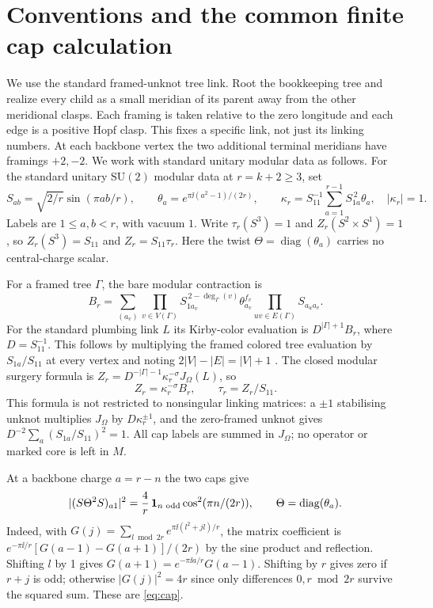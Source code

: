 \section{Conventions and the common finite cap calculation}\label{sec:conventions}
We use the standard framed-unknot tree link. Root the bookkeeping tree and realize every child as a small meridian of its parent away from the other meridional clasps. Each framing is taken relative to the zero longitude and each edge is a positive Hopf clasp. This fixes a specific link, not just its linking numbers. At each backbone vertex the two additional terminal meridians have framings \(+2,-2\). We work with standard unitary modular data as follows.
For the standard unitary \(\mathrm{SU}(2)\) modular data at \(r=k+2\ge3\), set
\[
 S_{ab}=\sqrt{2/r}\sin(\pi ab/r),\qquad
 \theta_a=e^{\pi\ii(a^2-1)/(2r)},\qquad
 \kappa_r=S_{11}^{-1}\sum_{a=1}^{r-1}S_{1a}^{\,2}\theta_a,\quad |\kappa_r|=1.
\]
Labels are \(1\le a,b<r\), with vacuum \(1\). Write \(\tau_r(S^3)=1\) and \(Z_r(S^2\times S^1)=1\), so \(Z_r(S^3)=S_{11}\) and \(Z_r=S_{11}\tau_r\). Here the twist \(\Theta=\operatorname{diag}(\theta_a)\) carries no central-charge scalar.

For a framed tree \(\Gamma\), the bare modular contraction is
\[
 B_r=\sum_{(a_v)}
     \prod_{v\in V(\Gamma)}S_{1a_v}^{\,2-\deg_\Gamma(v)}\theta_{a_v}^{f_v}
     \prod_{uv\in E(\Gamma)}S_{a_u a_v}.
\]
For the standard plumbing link \(L\) its Kirby-color evaluation is \(D^{|\Gamma|+1}B_r\), where \(D=S_{11}^{-1}\). This follows by multiplying the framed colored tree evaluation by \(S_{1a}/S_{11}\) at every vertex and noting \(2|V|-|E|=|V|+1\) \cite[App.~A]{GPPV}. The closed modular surgery formula is \(Z_r=D^{-|\Gamma|-1}\kappa_r^{-\sigma}J_\Omega(L)\), so
\[
 Z_r=\kappa_r^{-\sigma}B_r,\qquad \tau_r=Z_r/S_{11}.
\]
This formula is not restricted to nonsingular linking matrices: a \(\pm1\) stabilising unknot multiplies \(J_\Omega\) by \(D\kappa_r^{\pm1}\), and the zero-framed unknot gives \(D^{-2}\sum_a (S_{1a}/S_{11})^2=1\). All cap labels are summed in \(J_\Omega\); no operator or marked core is left in \(M\).

At a backbone charge \(a=r-n\) the two caps give
\begin{equation}\label{eq:cap}
 |(S\Theta^2 S)_{a1}|^2=\frac4r\,\mathbf 1_{n\text{ odd}}\cos^2(\pi n/(2r)),\qquad
 \Theta=\operatorname{diag}(\theta_a).
\end{equation}
Indeed, with \(G(j)=\sum_{l\bmod2r}e^{\pi\ii(l^2+jl)/r}\), the matrix coefficient is \(e^{-\pi\ii/r}[G(a-1)-G(a+1)]/(2r)\) by the sine product and reflection. Shifting \(l\) by 1 gives \(G(a+1)=e^{-\pi\ii a/r}G(a-1)\). Shifting by \(r\) gives zero if \(r+j\) is odd; otherwise \(|G(j)|^2=4r\) since only differences \(0,r\bmod 2r\) survive the squared sum. These are \eqref{eq:cap}.

